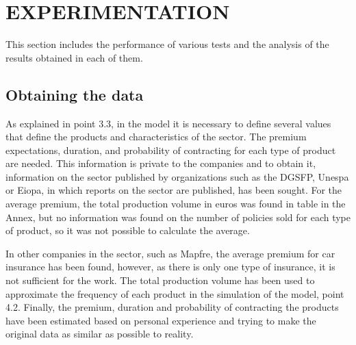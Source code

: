 \documentclass[review]{elsarticle}
\begin{document}
\section{EXPERIMENTATION}

This section includes the performance of various tests and the analysis of the results obtained in each of them.

\subsection{Obtaining the data}

As explained in point 3.3, in the model it is necessary to define several values that define the products and characteristics of the sector.
The premium expectations, duration, and probability of contracting for each type of product are needed. This information is private to the companies and to obtain it, information on the sector published by organizations such as the DGSFP, Unespa or Eiopa, in which reports on the sector are published, has been sought.
For the average premium, the total production volume in euros was found in \cite{chang2021shinydashboard} table in the Annex, but no information was found on the number of policies sold for each type of product, so it was not possible to calculate the average.

In other companies in the sector, such as Mapfre, the average premium for car insurance has been found, however, as there is only one type of insurance, it is not sufficient for the work.
The total production volume has been used to approximate the frequency of each product in the simulation of the model, point 4.2.
Finally, the premium, duration and probability of contracting the products have been estimated based on personal experience and trying to make the original data as similar as possible to reality.
\end{document}
